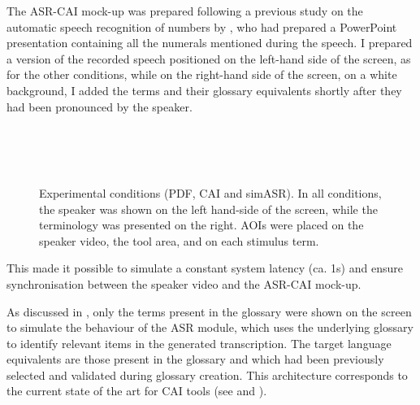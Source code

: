 The ASR-CAI mock-up was prepared following a previous study on the automatic speech recognition of numbers by \citet{desmet_simultaneous_2018}, who had prepared a PowerPoint presentation containing all the numerals mentioned during the speech. I prepared a version of the recorded speech positioned on the left-hand side of the screen, as for the other conditions, while on the right-hand side of the screen, on a white background, I added the terms and their glossary equivalents shortly after they had been pronounced by the speaker.
\begin{figure}
\\
\\
\\
\caption[Experimental conditions (PDF, CAI and simASR)]{Experimental conditions (PDF, CAI and simASR). In all conditions, the speaker was shown on the left hand-side of the screen, while the terminology was presented on the right. AOIs were placed on the speaker video, the tool area, and on each stimulus term.}
\label{fig:ASR_tool}
\end{figure}

This made it possible to simulate a constant system latency (ca. 1s) and ensure synchronisation between the speaker video and the ASR-CAI mock-up.

As discussed in , only the terms present in the glossary were shown on the screen to simulate the behaviour of the ASR module, which uses the underlying glossary to identify relevant items in the generated transcription. The target language equivalents are those present in the glossary and which had been previously selected and validated during glossary creation. This architecture corresponds to the current state of the art for CAI tools (see  and ).

